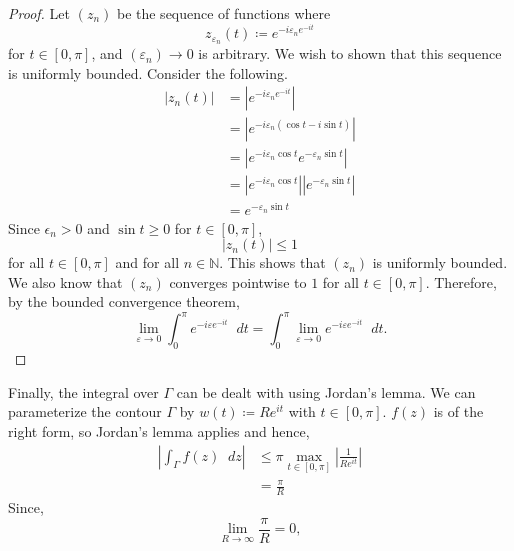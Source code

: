 \documentclass[a4paper]{article}
\newcommand*\diff{\mathop{}\!d} %
\theoremstyle{definition}
\begin{document}
\begin{proof}
    Let $(z_n)$ be the sequence of functions where
    \begin{equation*}
        z_{\varepsilon_n}(t) \coloneq e^{-i\varepsilon_n e^{-it}}
    \end{equation*}
    for $t \in [0, \pi]$,
    and $(\varepsilon_n) \to 0$ is arbitrary.
    We wish to shown that this sequence is uniformly bounded.
    Consider the following.
    \begin{align*}
        |z_n(t)| & = \left|e^{-i\varepsilon_n e^{-it}}\right|                                        \\
                 & = \left|e^{-i\varepsilon_n (\cos t - i\sin t)}\right|                             \\
                 & = \left|e^{-i\varepsilon_n \cos t} e^{-\varepsilon_n \sin t}\right|               \\
                 & = \left|e^{-i\varepsilon_n \cos t}\right|  \left|e^{-\varepsilon_n \sin t}\right| \\
                 & = e^{-\varepsilon_n \sin t}
    \end{align*}
    Since $\epsilon_n > 0$ and $\sin t \geq 0$ for $t \in [0,\pi]$,
    \begin{equation*}
        |z_n(t)| \leq 1
    \end{equation*}
    for all $t \in [0, \pi]$ and for all $n \in \mathbb{N}$.
    This shows that $(z_n)$ is uniformly bounded.
    We also know that $(z_n)$ converges pointwise to $1$ for all $t \in [0, \pi]$.
    Therefore, by the bounded convergence theorem,
    \begin{equation*}
        \lim_{\varepsilon \to 0} \int_{0}^{\pi} e^{-i\varepsilon e^{-it}} \diff t = \int_{0}^{\pi} \lim_{\varepsilon \to 0} e^{-i\varepsilon e^{-it}} \diff t.
    \end{equation*}
\end{proof}
Finally, the integral over $\Gamma$ can be dealt with using Jordan's lemma.
We can parameterize the contour $\Gamma$ by $w(t) \coloneq Re^{it}$ with $t \in [0, \pi]$.
$f(z)$ is of the right form, so Jordan's lemma applies and hence,
\begin{align*}
    \left| \int_{\Gamma} f(z) \diff z \right| & \leq \pi \max_{t \in [0,\pi]} \left|\frac{1}{Re^{it}}\right| \\
                                              & = \frac{\pi}{R}
\end{align*}
Since,
\begin{equation*}
    \lim_{R \to \infty} \frac{\pi}{R} = 0,
\end{equation*}
\end{document}
